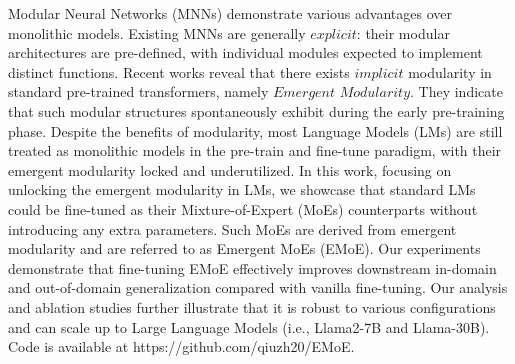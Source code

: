 Modular Neural Networks (MNNs) demonstrate various advantages over monolithic models. Existing MNNs are generally $\textit{explicit}$:  their modular architectures are pre-defined, with individual modules expected to implement distinct functions. Recent works reveal that there exists $\textit{implicit}$ modularity in standard pre-trained transformers, namely $\textit{Emergent Modularity}$. They indicate that such modular structures spontaneously exhibit during the early pre-training phase. Despite the benefits of modularity, most Language Models (LMs) are still treated as monolithic models in the pre-train and fine-tune paradigm, with their emergent modularity locked and underutilized. In this work, focusing on unlocking the emergent modularity in LMs, we showcase that standard LMs could be fine-tuned as their Mixture-of-Expert (MoEs) counterparts without introducing any extra parameters.  Such MoEs are derived from emergent modularity and are referred to as Emergent MoEs (EMoE). Our experiments demonstrate that fine-tuning EMoE effectively improves downstream in-domain and out-of-domain generalization compared with vanilla fine-tuning. Our analysis and ablation studies further illustrate that it is robust to various configurations and can scale up to Large Language Models (i.e., Llama2-7B and Llama-30B). Code is available at https://github.com/qiuzh20/EMoE.